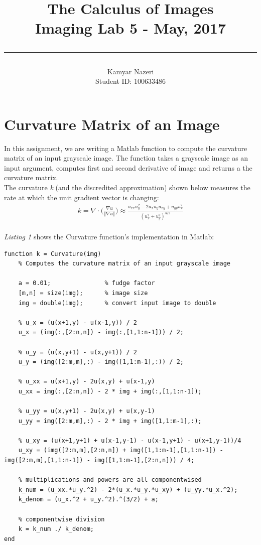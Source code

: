 \documentclass[a4paper,11pt]{article}
\begin{document}
\title{
	\Huge \textbf {The Calculus of Images}
    \\ [0.2cm]
	\LARGE Imaging Lab 5 - May, 2017
    \\ [0.5cm]
    \hrule
}

\date{}

\author{
		\Large Kamyar Nazeri \\
		\large Student ID: 100633486 }

\maketitle
\newpage

\section*{Curvature Matrix of an Image}
In this assignment, we are writing a Matlab function to compute the curvature matrix of an input grayscale image. The function takes a grayscale image as an input argument, computes first and second derivative of image and returns a the curvature matrix. \\
The curvature \emph{k} (and the discredited approximation) shown below measures the rate at which the unit gradient vector is changing:
\begin{align*}
  k = \nabla \cdot \bigg(\frac{\nabla u}{\Vert\nabla u\Vert}\bigg) \approx \frac{u_{xx}u_y^{2} - 2u_xu_yu_{xy} + u_{yy}u_x^{2}}{(u_x^{2} + u_y^{2})^{3/2}}
\end{align*}
\\
\emph{Listing 1} shows the Curvature function's implementation in Matlab:

\begin{lstlisting}[caption={Matlab Curvature Function},captionpos=b,style=Matlab-editor]
function k = Curvature(img)
    % Computes the curvature matrix of an input grayscale image

    a = 0.01;               % fudge factor
    [m,n] = size(img);      % image size
    img = double(img);      % convert input image to double

    % u_x = (u(x+1,y) - u(x-1,y)) / 2
    u_x = (img(:,[2:n,n]) - img(:,[1,1:n-1])) / 2;

    % u_y = (u(x,y+1) - u(x,y+1)) / 2
    u_y = (img([2:m,m],:) - img([1,1:m-1],:)) / 2;

    % u_xx = u(x+1,y) - 2u(x,y) + u(x-1,y)
    u_xx = img(:,[2:n,n]) - 2 * img + img(:,[1,1:n-1]);

    % u_yy = u(x,y+1) - 2u(x,y) + u(x,y-1)
    u_yy = img([2:m,m],:) - 2 * img + img([1,1:m-1],:);

    % u_xy = (u(x+1,y+1) + u(x-1,y-1) - u(x-1,y+1) - u(x+1,y-1))/4
    u_xy = (img([2:m,m],[2:n,n]) + img([1,1:m-1],[1,1:n-1]) -   img([2:m,m],[1,1:n-1]) - img([1,1:m-1],[2:n,n])) / 4;

    % multiplications and powers are all componentwised
    k_num = (u_xx.*u_y.^2) - 2*(u_x.*u_y.*u_xy) + (u_yy.*u_x.^2);
    k_denom = (u_x.^2 + u_y.^2).^(3/2) + a;

    % componentwise division
    k = k_num ./ k_denom;
end
\end{lstlisting}
\end{document}
